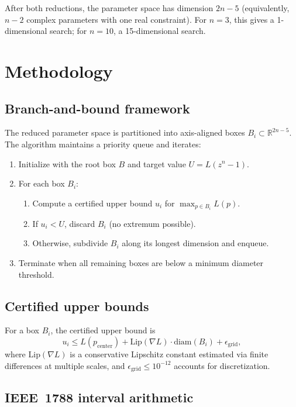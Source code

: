 \documentclass[11pt]{article}
\theoremstyle{plain}
\theoremstyle{definition}
\theoremstyle{remark}
\begin{document}
After both reductions, the parameter space has dimension $2n - 5$ (equivalently, $n - 2$ complex parameters with one real constraint). For $n = 3$, this gives a 1-dimensional search; for $n = 10$, a 15-dimensional search.

\section{Methodology}

\subsection{Branch-and-bound framework}

The reduced parameter space is partitioned into axis-aligned boxes $B_i \subset \mathbb{R}^{2n-5}$. The algorithm maintains a priority queue and iterates:

\begin{enumerate}[nosep]
\item Initialize with the root box $B$ and target value $U = L(z^n - 1)$.
\item For each box $B_i$:
  \begin{enumerate}[nosep]
  \item Compute a certified upper bound $u_i$ for $\max_{p \in B_i} L(p)$.
  \item If $u_i < U$, discard $B_i$ (no extremum possible).
  \item Otherwise, subdivide $B_i$ along its longest dimension and enqueue.
  \end{enumerate}
\item Terminate when all remaining boxes are below a minimum diameter threshold.
\end{enumerate}

\subsection{Certified upper bounds}

For a box $B_i$, the certified upper bound is
\[
u_i \leq L(p_{\text{center}}) + \mathrm{Lip}(\nabla L) \cdot \mathrm{diam}(B_i) + \epsilon_{\text{grid}},
\]
where $\mathrm{Lip}(\nabla L)$ is a conservative Lipschitz constant estimated via finite differences at multiple scales, and $\epsilon_{\text{grid}} \leq 10^{-12}$ accounts for discretization.

\subsection{IEEE~1788 interval arithmetic}
\end{document}
